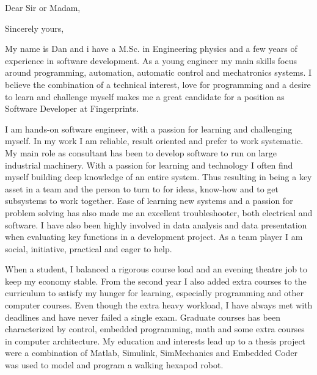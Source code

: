 \documentclass[11pt,a4paper,sans]{moderncv} %
\begin{document}
%
%



\clearpage

\date{\today} %
\opening{Dear Sir or Madam,} %
\closing{Sincerely yours,} %

\makelettertitle %

My name is Dan and i have a M.Sc. in Engineering physics and a few years of experience in software development.
As a young engineer my main skills focus around programming, automation, automatic control and mechatronics systems.
I believe the combination of a technical interest, love for programming and a desire to learn and challenge myself makes me a great candidate for a position as Software Developer at Fingerprints.

I am hands-on software engineer, with a passion for learning and challenging myself.
In my work I am reliable, result oriented and prefer to work systematic.
My main role as consultant has been to develop software to run on large industrial machinery.
With a passion for learning and technology I often find myself building deep knowledge of an entire system.
Thus resulting in being a key asset in a team and the person to turn to for ideas, know-how and to get subsystems to work together.
Ease of learning new systems and a passion for problem solving has also made me an excellent troubleshooter, both electrical and software.
I have also been highly involved in data analysis and data presentation when evaluating key functions in a development project.
As a team player I am social, initiative, practical and eager to help.

When a student, I balanced a rigorous course load and an evening theatre job to keep my economy stable.
From the second year I also added extra courses to the curriculum to satisfy my hunger for learning, especially programming and other computer courses.
Even though the extra heavy workload, I have always met with deadlines and have never failed a single exam.
Graduate courses has been characterized by control, embedded programming, math and some extra courses in computer architecture. 
My education and interests lead up to a thesis project were a combination of Matlab, Simulink, SimMechanics and Embedded Coder was used to model and program a walking hexapod robot.
\end{document}
